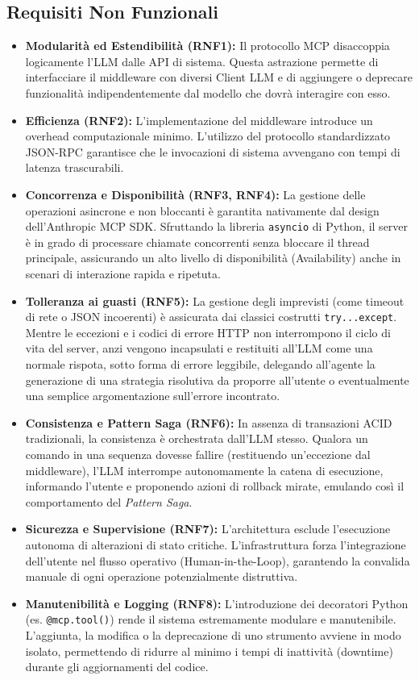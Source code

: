 \subsection{Requisiti Non Funzionali}
\begin{itemize}
    \item \textbf{Modularità ed Estendibilità (RNF1):} Il protocollo MCP disaccoppia logicamente l'LLM dalle API di sistema. Questa astrazione permette di interfacciare il middleware con diversi Client LLM e di aggiungere o deprecare funzionalità indipendentemente dal modello che dovrà interagire con esso.
    \item \textbf{Efficienza (RNF2):} L'implementazione del middleware introduce un overhead computazionale minimo. L'utilizzo del protocollo standardizzato JSON-RPC garantisce che le invocazioni di sistema avvengano con tempi di latenza trascurabili.
    \item \textbf{Concorrenza e Disponibilità (RNF3, RNF4):} La gestione delle operazioni asincrone e non bloccanti è garantita nativamente dal design dell'Anthropic MCP SDK. Sfruttando la libreria \texttt{asyncio} di Python, il server è in grado di processare chiamate concorrenti senza bloccare il thread principale, assicurando un alto livello di disponibilità (Availability) anche in scenari di interazione rapida e ripetuta.
    \item \textbf{Tolleranza ai guasti (RNF5):} La gestione degli imprevisti (come timeout di rete o JSON incoerenti) è assicurata dai classici costrutti \texttt{try...except}. Mentre le eccezioni e i codici di errore HTTP non interrompono il ciclo di vita del server, anzi vengono incapsulati e restituiti all'LLM come una normale rispota, sotto forma di errore leggibile, delegando all'agente la generazione di una strategia risolutiva da proporre all'utente o eventualmente una semplice argomentazione sull'errore incontrato.
    \item \textbf{Consistenza e Pattern Saga (RNF6):} In assenza di transazioni ACID tradizionali, la consistenza è orchestrata dall'LLM stesso. Qualora un comando in una sequenza dovesse fallire (restituendo un'eccezione dal middleware), l'LLM interrompe autonomamente la catena di esecuzione, informando l'utente e proponendo azioni di rollback mirate, emulando così il comportamento del \textit{Pattern Saga}.
    \item \textbf{Sicurezza e Supervisione (RNF7):} L'architettura esclude l'esecuzione autonoma di alterazioni di stato critiche. L'infrastruttura forza l'integrazione dell'utente nel flusso operativo (Human-in-the-Loop), garantendo la convalida manuale di ogni operazione potenzialmente distruttiva.
    \item \textbf{Manutenibilità e Logging (RNF8):} L'introduzione dei decoratori Python (es. \texttt{@mcp.tool()}) rende il sistema estremamente modulare e manutenibile. L'aggiunta, la modifica o la deprecazione di uno strumento avviene in modo isolato, permettendo di ridurre al minimo i tempi di inattività (downtime) durante gli aggiornamenti del codice.
\end{itemize}

